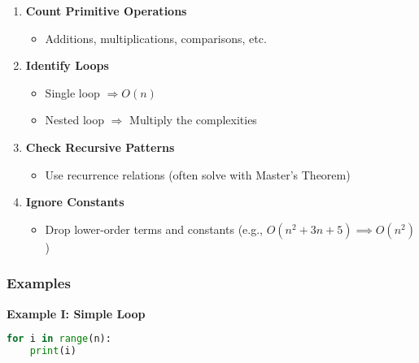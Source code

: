 \begin{enumerate}

    \item \textbf{Count Primitive Operations}

    \begin{itemize}

        \item Additions, multiplications, comparisons, etc.

    \end{itemize}

    \item \textbf{Identify Loops}

    \begin{itemize}

        \item Single loop \(\Rightarrow O(n)\)

        \item Nested loop \(\Rightarrow\) Multiply the complexities

    \end{itemize}

    \item \textbf{Check Recursive Patterns}

    \begin{itemize}

        \item Use recurrence relations (often solve with Master's Theorem)

    \end{itemize}

    \item \textbf{Ignore Constants}

    \begin{itemize}

        \item Drop lower-order terms and constants (e.g., \(O(n^2 + 3n + 5) \implies O(n^2)\))

    \end{itemize}

\end{enumerate}

\subsubsection{Examples}

\textbf{Example I: Simple Loop}

\begin{lstlisting}[language=Python]
for i in range(n):
    print(i)
\end{lstlisting}

